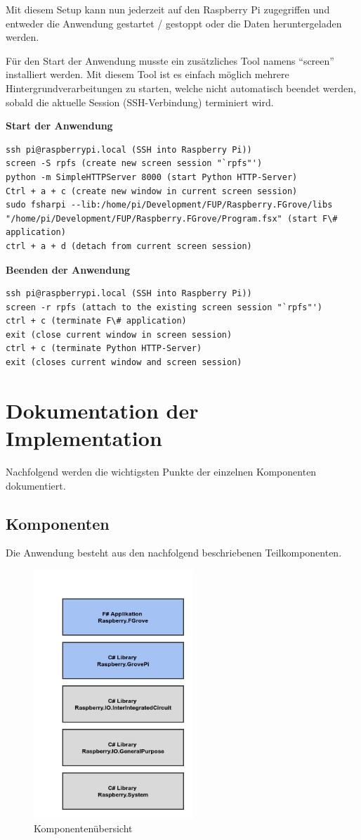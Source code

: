 Mit diesem Setup kann nun jederzeit auf den Raspberry Pi zugegriffen und entweder die Anwendung gestartet / gestoppt oder die Daten heruntergeladen werden.

Für den Start der Anwendung musste ein zusätzliches Tool namens "`screen"' installiert werden. Mit diesem Tool ist es einfach möglich mehrere Hintergrundverarbeitungen zu starten, welche nicht automatisch beendet werden, sobald die aktuelle Session (SSH-Verbindung) terminiert wird.

\textbf{Start der Anwendung}
\begin{lstlisting}
ssh pi@raspberrypi.local (SSH into Raspberry Pi))
screen -S rpfs (create new screen session "`rpfs"')
python -m SimpleHTTPServer 8000 (start Python HTTP-Server)
Ctrl + a + c (create new window in current screen session)
sudo fsharpi --lib:/home/pi/Development/FUP/Raspberry.FGrove/libs "/home/pi/Development/FUP/Raspberry.FGrove/Program.fsx" (start F\# application)
ctrl + a + d (detach from current screen session)
\end{lstlisting}

\textbf{Beenden der Anwendung}
\begin{lstlisting}
ssh pi@raspberrypi.local (SSH into Raspberry Pi))
screen -r rpfs (attach to the existing screen session "`rpfs"')
ctrl + c (terminate F\# application)
exit (close current window in screen session)
ctrl + c (terminate Python HTTP-Server)
exit (closes current window and screen session)
\end{lstlisting}

\section{Dokumentation der Implementation}
\label{sec:AnalyseCollection:ImplDoc}
Nachfolgend werden die wichtigsten Punkte der einzelnen Komponenten dokumentiert.

\subsection{Komponenten}
Die Anwendung besteht aus den nachfolgend beschriebenen Teilkomponenten.

\begin{figure}[H]
  \centering
  \includegraphics[width=6cm]{./images/Component-Overview}
  \caption{Komponentenübersicht}
\end{figure}

